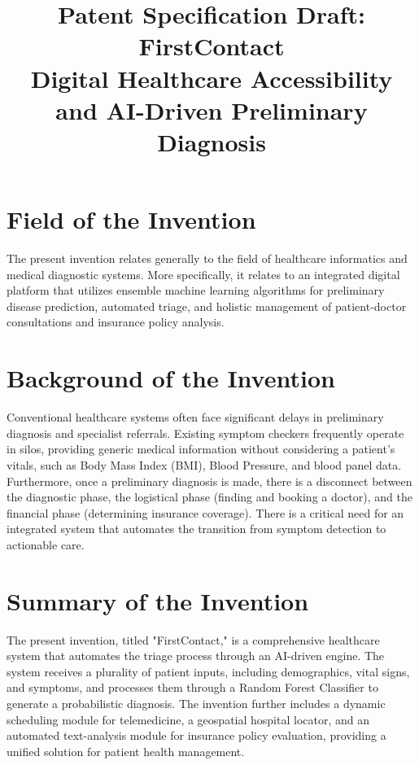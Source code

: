 \documentclass[12pt,a4paper]{article}
\title{\textbf{Patent Specification Draft: FirstContact}\\ \large Digital Healthcare Accessibility and AI-Driven Preliminary Diagnosis}
\author{}
\date{}
\begin{document}
\maketitle

\section{Field of the Invention}
The present invention relates generally to the field of healthcare informatics and medical diagnostic systems. More specifically, it relates to an integrated digital platform that utilizes ensemble machine learning algorithms for preliminary disease prediction, automated triage, and holistic management of patient-doctor consultations and insurance policy analysis.

\section{Background of the Invention}
Conventional healthcare systems often face significant delays in preliminary diagnosis and specialist referrals. Existing symptom checkers frequently operate in silos, providing generic medical information without considering a patient's vitals, such as Body Mass Index (BMI), Blood Pressure, and blood panel data. Furthermore, once a preliminary diagnosis is made, there is a disconnect between the diagnostic phase, the logistical phase (finding and booking a doctor), and the financial phase (determining insurance coverage). There is a critical need for an integrated system that automates the transition from symptom detection to actionable care.

\section{Summary of the Invention}
The present invention, titled "FirstContact," is a comprehensive healthcare system that automates the triage process through an AI-driven engine. The system receives a plurality of patient inputs, including demographics, vital signs, and symptoms, and processes them through a Random Forest Classifier to generate a probabilistic diagnosis. The invention further includes a dynamic scheduling module for telemedicine, a geospatial hospital locator, and an automated text-analysis module for insurance policy evaluation, providing a unified solution for patient health management.
\end{document}
